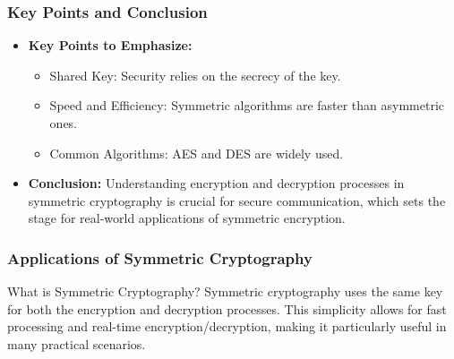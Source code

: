 \documentclass{beamer}
\begin{document}
\begin{frame}
    \frametitle{Key Points and Conclusion}
    \begin{itemize}
        \item \textbf{Key Points to Emphasize:}
        \begin{itemize}
            \item Shared Key: Security relies on the secrecy of the key.
            \item Speed and Efficiency: Symmetric algorithms are faster than asymmetric ones.
            \item Common Algorithms: AES and DES are widely used.
        \end{itemize}
        
        \item \textbf{Conclusion:} Understanding encryption and decryption processes in symmetric cryptography is crucial for secure communication, which sets the stage for real-world applications of symmetric encryption.
    \end{itemize}
\end{frame}

\begin{frame}[fragile]
    \frametitle{Applications of Symmetric Cryptography}
    \begin{block}{What is Symmetric Cryptography?}
        Symmetric cryptography uses the same key for both the encryption and decryption processes. 
        This simplicity allows for fast processing and real-time encryption/decryption, making it particularly useful in many practical scenarios.
    \end{block}
\end{frame}
\end{document}
